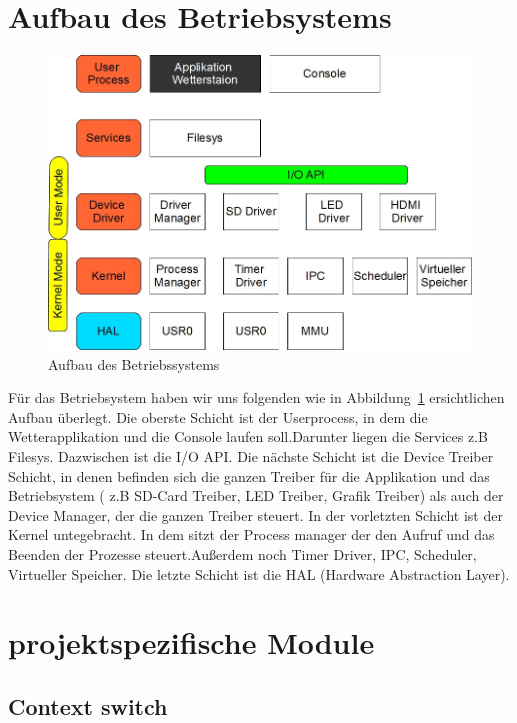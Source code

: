 \documentclass[10pt,a4paper,fleqn]{article}
\begin{document}
\section{Aufbau des Betriebsystems}

	\begin{figure}[h]
		\includegraphics[scale=0.5]{images/Aufbau.jpg}
		\caption{Aufbau des Betriebssystems}
		\label{fig01}
	\end{figure}
	
	Für das Betriebsystem haben wir uns folgenden wie in Abbildung~\ref{fig01} ersichtlichen
		Aufbau überlegt. Die oberste Schicht ist der
		Userprocess, in dem die Wetterapplikation und die Console laufen soll.Darunter liegen
		die Services z.B Filesys. Dazwischen ist die I/O API. Die nächste Schicht ist die
		Device Treiber Schicht, in denen befinden sich die ganzen Treiber für die Applikation und das
		Betriebsystem ( z.B SD-Card Treiber, LED Treiber, Grafik Treiber) als auch der Device Manager, der
		die ganzen Treiber steuert. In der vorletzten Schicht ist der Kernel untegebracht. In dem
		sitzt der Process manager der den Aufruf und das Beenden der Prozesse steuert.Außerdem noch
		Timer Driver, IPC, Scheduler, Virtueller Speicher. Die letzte Schicht ist die HAL (Hardware
		Abstraction Layer).

\section{projektspezifische Module}

\subsection{Context switch}
\end{document}
